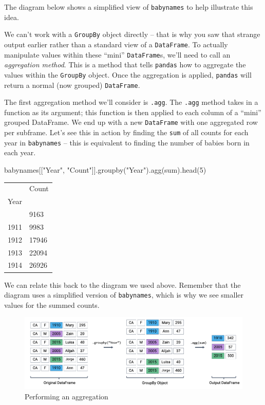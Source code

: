 \documentclass[
  letterpaper,
  DIV=11,
  numbers=noendperiod]{scrreprt}
\newenvironment{Shaded}{\begin{snugshade}}{\end{snugshade}}
\newcommand{\BuiltInTok}[1]{\textcolor[rgb]{0.00,0.23,0.31}{#1}}
\newcommand{\DecValTok}[1]{\textcolor[rgb]{0.68,0.00,0.00}{#1}}
\newcommand{\NormalTok}[1]{\textcolor[rgb]{0.00,0.23,0.31}{#1}}
\newcommand{\StringTok}[1]{\textcolor[rgb]{0.13,0.47,0.30}{#1}}
\begin{document}
The diagram below shows a simplified view of \texttt{babynames} to help
illustrate this idea.

We can't work with a \texttt{GroupBy} object directly -- that is why you
saw that strange output earlier rather than a standard view of a
\texttt{DataFrame}. To actually manipulate values within these ``mini''
\texttt{DataFrame}s, we'll need to call an \emph{aggregation method}.
This is a method that tells \texttt{pandas} how to aggregate the values
within the \texttt{GroupBy} object. Once the aggregation is applied,
\texttt{pandas} will return a normal (now grouped) \texttt{DataFrame}.

The first aggregation method we'll consider is \texttt{.agg}. The
\texttt{.agg} method takes in a function as its argument; this function
is then applied to each column of a ``mini'' grouped DataFrame. We end
up with a new \texttt{DataFrame} with one aggregated row per subframe.
Let's see this in action by finding the \texttt{sum} of all counts for
each year in \texttt{babynames} -- this is equivalent to finding the
number of babies born in each year.

\begin{Shaded}
\begin{Highlighting}[]
\NormalTok{babynames[[}\StringTok{"Year"}\NormalTok{, }\StringTok{"Count"}\NormalTok{]].groupby(}\StringTok{"Year"}\NormalTok{).agg(}\BuiltInTok{sum}\NormalTok{).head(}\DecValTok{5}\NormalTok{)}
\end{Highlighting}
\end{Shaded}

\begin{longtable}[]{@{}ll@{}}
\toprule\noalign{}
& Count \\
Year & \\
\midrule\noalign{}
\endhead
\bottomrule\noalign{}
\endlastfoot
1910 & 9163 \\
1911 & 9983 \\
1912 & 17946 \\
1913 & 22094 \\
1914 & 26926 \\
\end{longtable}

We can relate this back to the diagram we used above. Remember that the
diagram uses a simplified version of \texttt{babynames}, which is why we
see smaller values for the summed counts.

\begin{figure}[H]

{\centering \includegraphics{pandas_3/images/agg.png}

}

\caption{Performing an aggregation}

\end{figure}%
\end{document}
